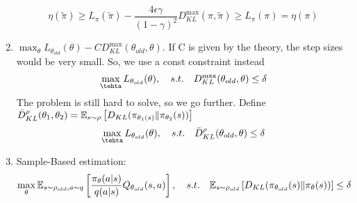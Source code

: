 \documentclass[a4paper]{article}
\begin{document}
\begin{enumerate}
        \[
            \eta(\tilde\pi) \ge L_{\pi}(\tilde\pi) - \frac{4\epsilon\gamma}{{(1 - \gamma)}^{2}} D^{\max}_{KL}(\pi, \tilde \pi) \ge L_{\pi}(\pi) = \eta(\pi)
        \]
    \item $ \max_{\theta} L_{\theta_{old}}(\theta) - C D^{\max}_{KL}(\theta_{old}, \theta) $. If C is given by the theory, the step sizes would be very small. So, we use a const constraint instead
        \[
            \max_{\tehta} L_{\theta_{old}}(\theta), \quad s.t.\quad D^{\max}_{KL}(\theta_{old}, \theta) \le \delta
        \]
        The problem is still hard to solve, so we go further.
        Define $ \bar D^{\rho}_{KL}(\theta_1, \theta_2) = \mathbb{E}_{s\sim\rho}\left[ D_{KL}(\pi_{\theta_1(s)} \Arrowvert \pi_{\theta_2}(s)) \right] $
        \[
            \max_{\tehta} L_{\theta_{old}}(\theta), \quad s.t.\quad \bar D^{\rho}_{KL}(\theta_{old}, \theta) \le \delta
        \]
    \item Sample-Based estimation:
        \[
            \max_{\theta} \mathbb{E}_{s \sim \rho_{old}, a \sim q} \left[ \frac{\pi_{\theta}(a|s)}{q(a|s)} Q_{\theta_{old}}(s,a) \right],
            \quad s.t.\quad 
            \mathbb{E}_{s \sim \rho_{old}} \left[ D_{KL}(\pi_{\theta_{old}}(s) \Arrowvert \pi_{\theta}(s)) \right] \le \delta
        \]
\end{enumerate}
\end{document}
